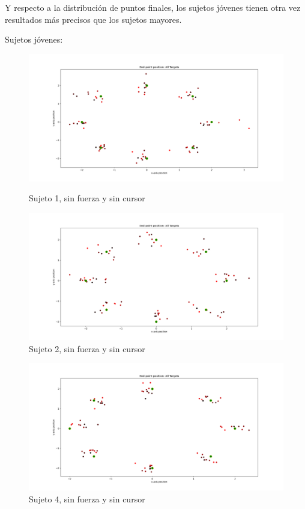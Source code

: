\documentclass[a4paper,11pt, oneside]{book}
\begin{document}
Y respecto a la distribución de puntos finales, los sujetos jóvenes tienen otra vez resultados más precisos que los sujetos mayores.

Sujetos jóvenes:
\\
\begin{figure}[H]
	\begin{minipage}[b]{0.5\linewidth}
		\centering
		\includegraphics[width=\linewidth]{sujeto1/no_force_no_cursor/trayectorias_puntos}
		\caption{Sujeto 1, sin fuerza y sin cursor}
		\label{fig:figura1}
	\end{minipage}
	\hspace{0.5cm}
	\begin{minipage}[b]{0.5\linewidth}
		\centering
		\includegraphics[width=\linewidth]{sujeto2/no_force_no_cursor/trayectorias_puntos}
		\caption{Sujeto 2, sin fuerza y sin cursor}
		\label{fig:figura2}
	\end{minipage}
\end{figure}
\begin{figure}[H]
	\begin{minipage}[b]{0.5\linewidth}
		\centering
		\includegraphics[width=\linewidth]{sujeto4/no_force_no_cursor/trayectorias_puntos}
		\caption{Sujeto 4, sin fuerza y sin cursor}
		\label{fig:figura1}
	\end{minipage}
\end{figure}
\end{document}
